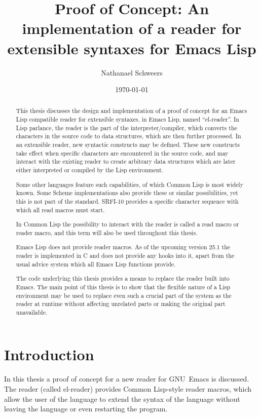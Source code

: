 \documentclass[a4paper,10pt,twoside]{report}
\author{Nathanael Schweers}
\date{\today}
\title{Proof of Concept: An implementation of a reader for extensible syntaxes for Emacs Lisp}
\newcommand{\el}{Emacs Lisp}
\newcommand{\cl}{Common Lisp}
\newcommand{\elr}{el-reader}
\newcommand{\emacs}{GNU~Emacs}
\begin{document}
\maketitle

\begin{abstract}
  This thesis discusses the design and implementation of a proof of concept for
  an \el{} compatible reader for extensible syntaxes, in \el{}, named
  ``\elr{}''.  In Lisp parlance, the reader is the part of the
  interpreter/compiler, which converts the characters in the source code to data
  structures, which are then further processed.  In an extensible reader, new
  syntactic constructs may be defined.  These new constructs take effect when
  specific characters are encountered in the source code, and may interact with
  the existing reader to create arbitrary data structures which are later either
  interpreted or compiled by the Lisp environment.

  Some other languages feature such capabilities, of which \cl{} is most widely
  known.  Some Scheme implementations also provide these or similar
  possibilities, yet this is not part of the standard.  SRFI-10 provides a
  specific character sequence with which all read macros must
  start. \cite{srfi-10}

  In \cl{} the possibility to interact with the reader is called a read macro or
  reader macro, and this term will also be used throughout this thesis.

  \el{} does not provide reader macros.  As of the upcoming version 25.1 the
  reader is implemented in C and does not provide any hooks into it, apart from
  the usual advice system which all \el{} functions provide.

  The code underlying this thesis provides a means to replace the reader built
  into Emacs.  The main point of this thesis is to show that the flexible nature
  of a Lisp environment may be used to replace even such a crucial part of the
  system as the reader at runtime without affecting unrelated parts or making
  the original part unavailable.
\end{abstract}

\tableofcontents

\chapter{Introduction}
\label{chap:introduction}

In this thesis a proof of concept for a new reader for \emacs{} is discussed.
The reader (called \elr{}) provides \cl{}-style reader macros, which allow the
user of the language to extend the syntax of the language without leaving the
language or even restarting the program.
\end{document}
